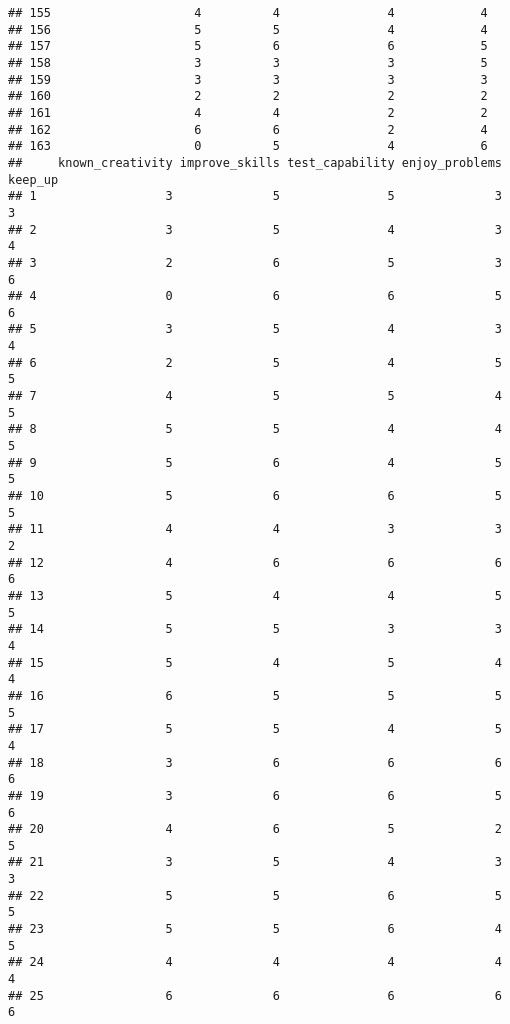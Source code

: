 \documentclass[
]{article}
\begin{document}
\begin{verbatim}
## 155                    4          4               4            4
## 156                    5          5               4            4
## 157                    5          6               6            5
## 158                    3          3               3            5
## 159                    3          3               3            3
## 160                    2          2               2            2
## 161                    4          4               2            2
## 162                    6          6               2            4
## 163                    0          5               4            6
##     known_creativity improve_skills test_capability enjoy_problems keep_up
## 1                  3              5               5              3       3
## 2                  3              5               4              3       4
## 3                  2              6               5              3       6
## 4                  0              6               6              5       6
## 5                  3              5               4              3       4
## 6                  2              5               4              5       5
## 7                  4              5               5              4       5
## 8                  5              5               4              4       5
## 9                  5              6               4              5       5
## 10                 5              6               6              5       5
## 11                 4              4               3              3       2
## 12                 4              6               6              6       6
## 13                 5              4               4              5       5
## 14                 5              5               3              3       4
## 15                 5              4               5              4       4
## 16                 6              5               5              5       5
## 17                 5              5               4              5       4
## 18                 3              6               6              6       6
## 19                 3              6               6              5       6
## 20                 4              6               5              2       5
## 21                 3              5               4              3       3
## 22                 5              5               6              5       5
## 23                 5              5               6              4       5
## 24                 4              4               4              4       4
## 25                 6              6               6              6       6

\end{verbatim}
\end{document}
